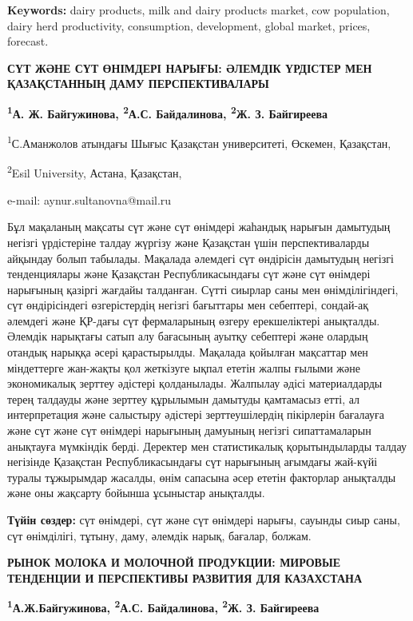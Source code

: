 {\bfseries Keywords:} dairy products, milk and dairy products market, cow
population, dairy herd productivity, consumption, development, global
market, prices, forecast.

{\bfseries СҮТ ЖӘНЕ СҮТ ӨНІМДЕРІ НАРЫҒЫ: ӘЛЕМДІК ҮРДІСТЕР МЕН ҚАЗАҚСТАННЫҢ
ДАМУ ПЕРСПЕКТИВАЛАРЫ}

{\bfseries \textsuperscript{1}А. Ж. Байгужинова, \textsuperscript{2}А.С.
Байдалинова\textsuperscript{\envelope }, \textsuperscript{2}Ж. З. Байгиреева}

\textsuperscript{1}С.Аманжолов атындағы Шығыс Қазақстан университеті,
Өскемен, Қазақстан,

\textsuperscript{2}Esil University, Астана, Қазақстан,

e-mail: aynur.sultanovna@mail.ru

Бұл мақаланың мақсаты сүт және сүт өнімдері жаһандық нарығын дамытудың
негізгі үрдістеріне талдау жүргізу және Қазақстан үшін перспективаларды
айқындау болып табылады. Мақалада әлемдегі сүт өндірісін дамытудың
негізгі тенденциялары және Қазақстан Республикасындағы сүт және сүт
өнімдері нарығының қазіргі жағдайы талданған. Сүтті сиырлар саны мен
өнімділігіндегі, сүт өндірісіндегі өзгерістердің негізгі бағыттары мен
себептері, сондай-ақ әлемдегі және ҚР-дағы сүт фермаларының өзгеру
ерекшеліктері анықталды. Әлемдік нарықтағы сатып алу бағасының ауытқу
себептері және олардың отандық нарыққа әсері қарастырылды. Мақалада
қойылған мақсаттар мен міндеттерге жан-жақты қол жеткізуге ықпал ететін
жалпы ғылыми және экономикалық зерттеу әдістері қолданылады. Жалпылау
әдісі материалдарды терең талдауды және зерттеу құрылымын дамытуды
қамтамасыз етті, ал интерпретация және салыстыру әдістері
зерттеушілердің пікірлерін бағалауға және сүт және сүт өнімдері
нарығының дамуының негізгі сипаттамаларын анықтауға мүмкіндік берді.
Деректер мен статистикалық қорытындыларды талдау негізінде Қазақстан
Республикасындағы сүт нарығының ағымдағы жай-күйі туралы тұжырымдар
жасалды, өнім сапасына әсер ететін факторлар анықталды және оны жақсарту
бойынша ұсыныстар анықталды.

{\bfseries Түйін сөздер:} сүт өнімдері, сүт және сүт өнімдері нарығы,
сауынды сиыр саны, сүт өнімділігі, тұтыну, даму, әлемдік нарық, бағалар,
болжам.

{\bfseries РЫНОК МОЛОКА И МОЛОЧНОЙ ПРОДУКЦИИ: МИРОВЫЕ ТЕНДЕНЦИИ И
ПЕРСПЕКТИВЫ РАЗВИТИЯ ДЛЯ КАЗАХСТАНА}

{\bfseries \textsuperscript{1}А.Ж.Байгужинова, \textsuperscript{2}А.С.
Байдалинова\textsuperscript{\envelope }, \textsuperscript{2}Ж. З. Байгиреева}

